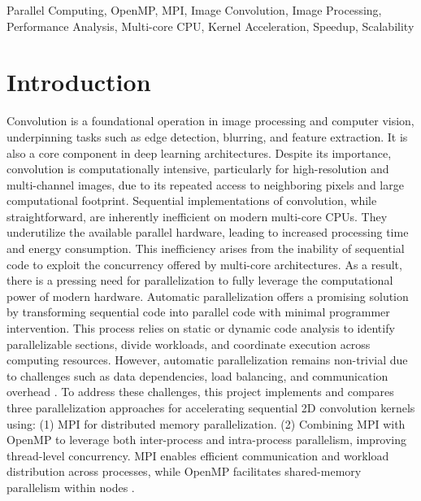 \documentclass[conference, 10pt]{IEEEtran}
\begin{document}
\begin{IEEEkeywords}
Parallel Computing, OpenMP, MPI, Image Convolution, Image Processing, Performance Analysis, Multi-core CPU, Kernel Acceleration, Speedup, Scalability
\end{IEEEkeywords}


\section{Introduction}
Convolution is a foundational operation in image processing and computer vision, 
underpinning tasks such as edge detection, blurring, and feature extraction. It is also a core component in deep learning architectures. 
Despite its importance, convolution is computationally intensive, particularly for high-resolution and multi-channel images, 
due to its repeated access to neighboring pixels and large computational footprint.
Sequential implementations of convolution, while straightforward, are inherently inefficient on modern multi-core CPUs. 
They underutilize the available parallel hardware, leading to increased processing time and energy consumption. 
This inefficiency arises from the inability of sequential code to exploit the concurrency offered by multi-core architectures.
As a result, there is a pressing need for parallelization to fully leverage the computational power of modern hardware. 
Automatic parallelization offers a promising solution by transforming sequential code into parallel code with minimal programmer intervention. 
This process relies on static or dynamic code analysis to identify parallelizable sections,
divide workloads, and coordinate execution across computing resources. 
However, automatic parallelization remains non-trivial due to challenges such as data dependencies, 
load balancing, and communication overhead \cite{hager2021hpc}.
To address these challenges, this project implements and compares three parallelization approaches 
for accelerating sequential 2D convolution kernels using: 
(1) MPI for distributed memory parallelization\cite{toth2016convolution}. 
(2) Combining MPI with OpenMP to leverage both inter-process and intra-process parallelism, improving thread-level concurrency.
MPI enables efficient communication and workload distribution across processes, 
while OpenMP facilitates shared-memory parallelism within nodes \cite{farber2011openmp}. 
\end{document}
